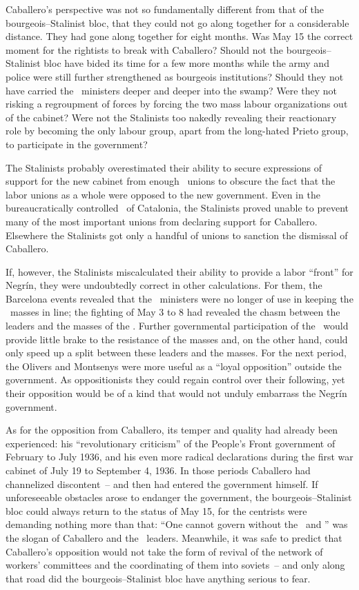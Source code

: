 Caballero’s perspective was not so fundamentally different from that of the bourgeois--Stalinist bloc, that they could not go along together for a considerable distance. They had gone along together for eight months. Was May 15 the correct moment for the rightists to break with Caballero? Should not the bourgeois--Stalinist bloc have bided its time for a few more months while the army and police were still further strengthened as bourgeois institutions? Should they not have carried the \CNT\ ministers deeper and deeper into the swamp? Were they not risking a regroupment of forces by forcing the two mass labour organizations out of the cabinet? Were not the Stalinists too nakedly revealing their reactionary role by becoming the only labour group, apart from the long-hated Prieto group, to participate in the government?

The Stalinists probably overestimated their ability to secure expressions of support for the new cabinet from enough \UGT\ unions to obscure the fact that the labor unions as a whole were opposed to the new government. Even in the bureaucratically controlled \UGT\ of Catalonia, the Stalinists proved unable to prevent many of the most important unions from declaring support for Caballero. Elsewhere the Stalinists got only a handful of unions to sanction the dismissal of Caballero.

If, however, the Stalinists miscalculated their ability to provide a labor ``front'' for Negr\'in, they were undoubtedly correct in other calculations. For them, the Barcelona events revealed that the \CNT\ ministers were no longer of use in keeping the \CNT\ masses in line; the fighting of May 3 to 8 had revealed the chasm between the leaders and the masses of the \CNT\kn. Further governmental participation of the \CNT\ would provide little brake to the resistance of the masses and, on the other hand, could only speed up a split between these leaders and the masses. For the next period, the Olivers and Montsenys were more useful as a ``loyal opposition'' outside the government. As oppositionists they could regain control over their following, yet their opposition would be of a kind that would not unduly embarrass the Negr\'in government.

As for the opposition from Caballero, its temper and quality had already been experienced: his ``revolutionary criticism'' of the People’s Front government of February to July 1936, and his even more radical declarations during the first war cabinet of July 19 to September 4, 1936. In those periods Caballero had channelized discontent~-- and then had entered the government himself. If unforeseeable obstacles arose to endanger the government, the bourgeois--Stalinist bloc could always return to the status of May 15, for the centrists were demanding nothing more than that: ``One cannot govern without the \UGT\ and \CNT'' was the slogan of Caballero and the \CNT\ leaders. Meanwhile, it was safe to predict that Caballero’s opposition would not take the form of revival of the network of workers’ committees and the coordinating of them into soviets~-- and only along that road did the bourgeois--Stalinist bloc have anything serious to fear.

